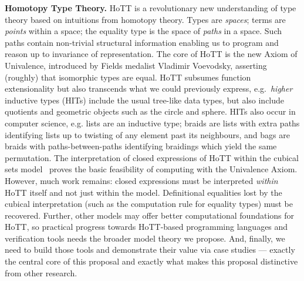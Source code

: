 \documentclass[a4paper,11pt]{article}
\begin{document}
{\bf Homotopy Type Theory.} HoTT is a revolutionary new understanding of
type theory based on intuitions from homotopy theory. Types are
\emph{spaces}; terms are \emph{points} within a space; the equality
type is the space of \emph{paths} in a space. Such paths contain
non-trivial structural information enabling us to program and reason up to invariance of
representation. The core of HoTT is the new Axiom of Univalence,
introduced by Fields medalist Vladimir Voevodsky, asserting (roughly)
that isomorphic types are equal. HoTT subsumes function extensionality
but also transcends what we could previously express, e.g.\
\emph{higher} inductive types (HITs) include the usual tree-like data
types, but also include quotients \cite{alti:mpc04} and geometric
objects such as the circle and sphere. HITs also occur in computer
science, e.g. lists are an inductive type; braids are lists with extra
paths identifying lists up to twisting of any element past its
neighbours, and bags are braids with paths-between-paths identifying
braidings which yield the same permutation. 
The interpretation of closed expressions of HoTT within the cubical
sets model~\cite{BezemM:cubsmt, nominal} proves the basic feasibility of computing
with the Univalence Axiom. However, much work remains: closed
expressions  must be interpreted  \emph{within} HoTT itself and 
not just within the model. Definitional equalities lost by the cubical interpretation (such as
the computation rule for equality types) must be recovered. Further, other models may
offer better computational foundations for HoTT, so practical progress
towards HoTT-based programming languages and verification tools needs
the broader model theory we propose. And, finally, we need to build those
tools and demonstrate their value via case studies --- exactly the central core of this
proposal and exactly what makes this proposal
distinctive from other research. 








\end{document}
